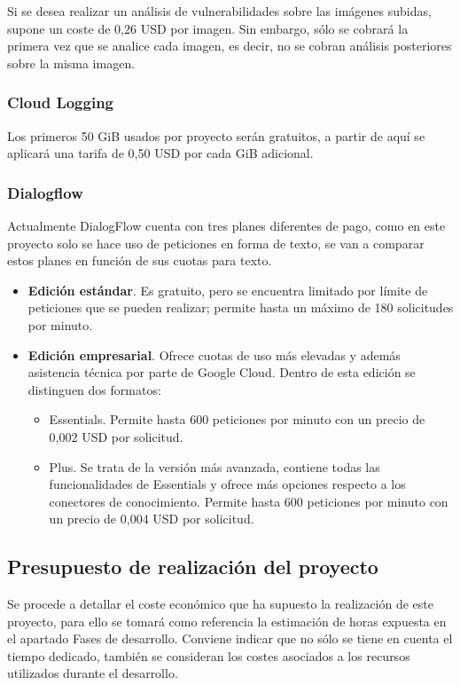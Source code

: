 Si se desea realizar un análisis de vulnerabilidades sobre las imágenes subidas, supone un coste de 0,26 USD por imagen. Sin embargo, sólo se cobrará la primera vez que se analice cada imagen, es decir, no se cobran análisis posteriores sobre la misma imagen.

\subsubsection{Cloud Logging}

Los primeros 50 GiB usados por proyecto serán gratuitos, a partir de aquí se aplicará una tarifa de 0,50 USD por cada GiB adicional.

\subsubsection{Dialogflow}

Actualmente DialogFlow cuenta con tres planes diferentes de pago, como en este proyecto solo se hace uso de peticiones en forma de texto, se van a comparar estos planes en función de sus cuotas para texto.
\begin{itemize}
    \item \textbf{Edición estándar}. Es gratuito, pero se encuentra limitado por límite de peticiones que se pueden realizar; permite hasta un máximo de 180 solicitudes por minuto.
    \item \textbf{Edición empresarial}. Ofrece cuotas de uso más elevadas y además asistencia técnica por parte de Google Cloud. Dentro de esta edición se distinguen dos formatos:
    \begin{itemize}
        \item Essentials. Permite hasta 600 peticiones por minuto con un precio de 0,002 USD por solicitud.
        \item Plus. Se trata de la versión más avanzada, contiene todas las funcionalidades de Essentials y ofrece más opciones respecto a los conectores de conocimiento. Permite hasta 600 peticiones por minuto con un precio de 0,004 USD por solicitud.
    \end{itemize}
\end{itemize}


\subsection{Presupuesto de realización del proyecto}

Se procede a detallar el coste económico que ha supuesto la realización de este proyecto, para ello se tomará como referencia la estimación de horas expuesta en el apartado Fases de desarrollo. Conviene indicar que no sólo se tiene en cuenta el tiempo dedicado, también se consideran los costes asociados a los recursos utilizados durante el desarrollo.


